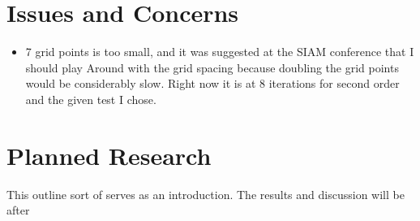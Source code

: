 \documentclass[a4paper]{article}
\begin{document}
 
\section{Issues and Concerns}
\begin{itemize}
    \item 7 grid points is too small, and it was suggested at the SIAM conference
        that I should play Around with the grid spacing because doubling the 
        grid points would be considerably slow. Right now it is at 8 iterations 
        for second order and the given test I chose.
\end{itemize}
\section{Planned Research}
This outline sort of serves as an introduction.  The results and discussion will
be after 
\end{document}
